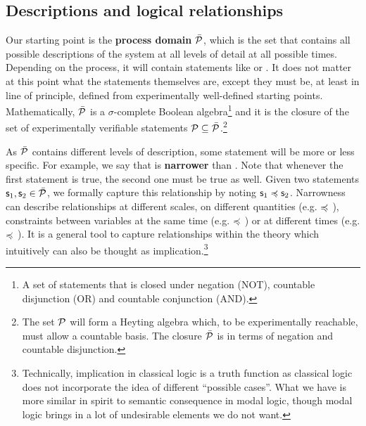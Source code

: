 \documentclass[letterpaper]{article}
\begin{document}
\subsection{Descriptions and logical relationships}

Our starting point is the \textbf{process domain} $\tdomain[P]$, which is the set that contains all possible descriptions of the system at all levels of detail at all possible times. Depending on the process, it will contain statements like  or . It does not matter at this point what the statements themselves are, except they must be, at least in line of principle, defined from experimentally well-defined starting points. Mathematically, $\tdomain[P]$ is a $\sigma$-complete Boolean algebra\footnote{A set of statements that is closed under negation (NOT), countable disjunction (OR) and countable conjunction (AND).} and it is the closure of the set of experimentally verifiable statements $\edomain[P] \subseteq \tdomain[P]$.\footnote{The set $\edomain[P]$ will form a Heyting algebra which, to be experimentally reachable, must allow a countable basis. The closure $\tdomain[P]$ is in terms of negation and countable disjunction.}

As $\tdomain[P]$ contains different levels of description, some statement will be more or less specific. For example, we say that  is \textbf{narrower} than . Note that whenever the first statement is true, the second one must be true as well. Given two statements $\stmt_1, \stmt_2 \in \tdomain[P]$, we formally capture this relationship by noting $\stmt_1 \narrower \stmt_2$. Narrowness can describe relationships at different scales, on different quantities (e.g.  $\narrower$ ), constraints between variables at the same time (e.g.  $\narrower$ ) or at different times (e.g.  $\narrower$ ). It is a general tool to capture relationships within the theory which intuitively can also be thought as implication.\footnote{Technically, implication in classical logic is a truth function as classical logic does not incorporate the idea of different ``possible cases''. What we have is more similar in spirit to semantic consequence in modal logic, though modal logic brings in a lot of undesirable elements we do not want.}
\end{document}
